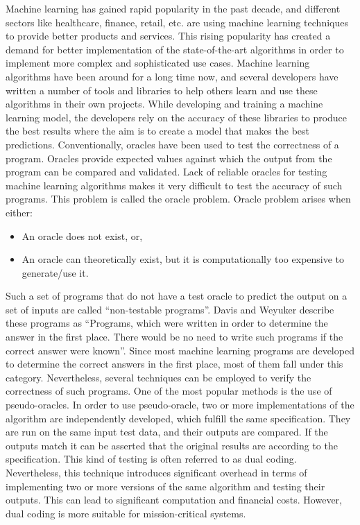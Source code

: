 
Machine learning has gained rapid popularity in the past decade, and different sectors like healthcare, finance, retail, etc. are using machine learning techniques to provide better products and services. This rising popularity has created a demand for better implementation of the state-of-the-art algorithms in order to implement more complex and sophisticated use cases. Machine learning algorithms have been around for a long time now, and several developers have written a number of tools and libraries to help others learn and use these algorithms in their own projects.  While developing and training a machine learning model, the developers rely on the accuracy of these libraries to produce the best results where the aim is to create a model that makes the best predictions.
Conventionally, oracles have been used to test the correctness of a program. Oracles provide expected values against which the output from the program can be compared and validated. Lack of reliable oracles for testing machine learning algorithms makes it very difficult to test the accuracy of such programs. This problem is called the oracle problem\cite{Weyuker}. Oracle problem arises when either:
\begin{itemize}
  \item An oracle does not exist, or,
  \item An oracle can theoretically exist, but it is computationally too expensive to generate/use it.
\end{itemize}
Such a set of programs that do not have a test oracle to predict the output on a set of inputs are called \enquote{non-testable programs}\cite{Weyuker}. Davis and Weyuker describe these programs as \enquote{Programs, which were written in order to determine the answer in the first place. There would be no need to write such programs if the correct answer were known}\cite{Davis1981}. Since most machine learning programs are developed to determine the correct answers in the first place, most of them fall under this category. Nevertheless, several techniques can be employed to verify the correctness of such programs. One of the most popular methods is the use of pseudo-oracles. In order to use pseudo-oracle, two or more implementations of the algorithm are independently developed, which fulfill the same specification. They are run on the same input test data, and their outputs are compared. If the outputs match it can be asserted that the original results are according to the specification. This kind of testing is often referred to as dual coding. Nevertheless, this technique introduces significant overhead in terms of implementing two or more versions of the same algorithm and testing their outputs. This can lead to significant computation and financial costs. However, dual coding is more suitable for mission-critical systems\cite{Weyuker}.
\newline

